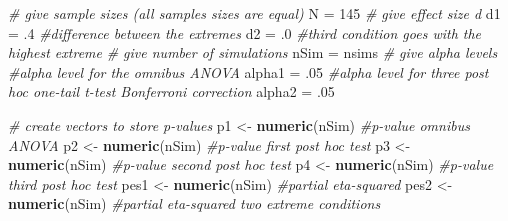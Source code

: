 \documentclass[]{book}
\newenvironment{Shaded}{\begin{snugshade}}{\end{snugshade}}
\newcommand{\CommentTok}[1]{\textcolor[rgb]{0.56,0.35,0.01}{\textit{#1}}}
\newcommand{\DecValTok}[1]{\textcolor[rgb]{0.00,0.00,0.81}{#1}}
\newcommand{\FloatTok}[1]{\textcolor[rgb]{0.00,0.00,0.81}{#1}}
\newcommand{\KeywordTok}[1]{\textcolor[rgb]{0.13,0.29,0.53}{\textbf{#1}}}
\newcommand{\NormalTok}[1]{#1}
\newcommand{\StringTok}[1]{\textcolor[rgb]{0.31,0.60,0.02}{#1}}
\begin{document}
\begin{Shaded}
\begin{Highlighting}[]
\CommentTok{# give sample sizes (all samples sizes are equal)}
\NormalTok{N =}\StringTok{ }\DecValTok{145}
\CommentTok{# give effect size d}
\NormalTok{d1 =}\StringTok{ }\FloatTok{.4} \CommentTok{#difference between the extremes}
\NormalTok{d2 =}\StringTok{ }\FloatTok{.0} \CommentTok{#third condition goes with the highest extreme}
\CommentTok{# give number of simulations}
\NormalTok{nSim =}\StringTok{ }\NormalTok{nsims}
\CommentTok{# give alpha levels}
\CommentTok{#alpha level for the omnibus ANOVA}
\NormalTok{alpha1 =}\StringTok{ }\FloatTok{.05} 
\CommentTok{#alpha level for three post hoc one-tail t-test Bonferroni correction}
\NormalTok{alpha2 =}\StringTok{ }\FloatTok{.05} 
\end{Highlighting}
\end{Shaded}

\begin{Shaded}
\begin{Highlighting}[]
\CommentTok{# create vectors to store p-values}
\NormalTok{p1 <-}\StringTok{ }\KeywordTok{numeric}\NormalTok{(nSim) }\CommentTok{#p-value omnibus ANOVA}
\NormalTok{p2 <-}\StringTok{ }\KeywordTok{numeric}\NormalTok{(nSim) }\CommentTok{#p-value first post hoc test}
\NormalTok{p3 <-}\StringTok{ }\KeywordTok{numeric}\NormalTok{(nSim) }\CommentTok{#p-value second post hoc test}
\NormalTok{p4 <-}\StringTok{ }\KeywordTok{numeric}\NormalTok{(nSim) }\CommentTok{#p-value third post hoc test}
\NormalTok{pes1 <-}\StringTok{ }\KeywordTok{numeric}\NormalTok{(nSim) }\CommentTok{#partial eta-squared}
\NormalTok{pes2 <-}\StringTok{ }\KeywordTok{numeric}\NormalTok{(nSim) }\CommentTok{#partial eta-squared two extreme conditions}
\end{Highlighting}
\end{Shaded}
\end{document}
